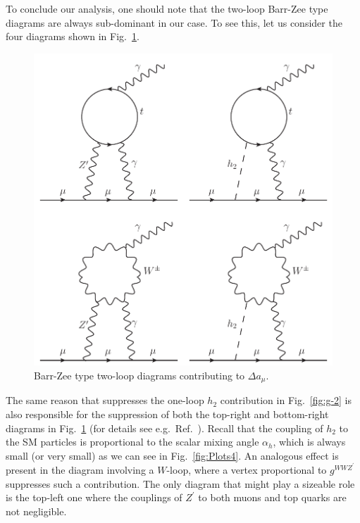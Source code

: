 \documentclass[a4paper,11pt]{article}
\renewcommand{\[}{\left[}
\renewcommand{\]}{\right]}
\begin{document}
To conclude our analysis, one should note that the two-loop Barr-Zee type diagrams \cite{Barr:1990vd} are always sub-dominant in our case. To see this, let us consider the four diagrams shown in Fig.~\ref{fig:Barr-Zee}.
\begin{figure}[!htb]
	\centering
	\includegraphics[scale=0.6]{Barr-Zee.pdf}
	\caption{Barr-Zee type two-loop diagrams contributing to $\Delta a_\mu$.}
	\label{fig:Barr-Zee}
\end{figure}	
The same reason that suppresses the one-loop $h_2$ contribution in Fig.~\ref{fig:g-2} is also responsible for the suppression of both the top-right and bottom-right diagrams in Fig.~\ref{fig:Barr-Zee} (for details see e.g.~Ref.~\cite{Ilisie:2015tra}). Recall that the coupling of $h_2$ to the SM particles is proportional to the scalar mixing angle $\alpha_h$, which is always small (or very small) as we can see in Fig.~\ref{fig:Plots4}. An analogous effect is present in the diagram involving a $W$-loop, where a vertex proportional to $g^{WWZ^\prime}$ suppresses such a contribution. The only diagram that might play a sizeable role is the top-left one where the couplings of $Z^\prime$ to both muons and top quarks are not negligible.
\end{document}
